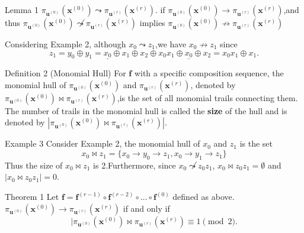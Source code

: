 \documentclass[notheorems,aspectratio=169]{beamer}
\def\bd#1{\boldsymbol{#1}}
\begin{document}
\begin{frame}
    
    \begin{block}{Lemma 1}
        $\pi_{\boldsymbol{u}^{(0)}}(\boldsymbol{x}^{(0)})\leadsto \pi_{\boldsymbol{u}^{(r)}}(\boldsymbol{x}^{(r)})$.
        if $\pi_{\boldsymbol{u}^{(0)}}(\boldsymbol{x}^{(0)})\rightarrow \pi_{\boldsymbol{u}^{(r)}}(\boldsymbol{x}^{(r)})$,and thus
        $\pi_{\boldsymbol{u}^{(0)}}(\boldsymbol{x}^{(0)})\not \leadsto \pi_{\boldsymbol{u}^{(r)}}(\boldsymbol{x}^{(r)})$
        implies $\pi_{\boldsymbol{u}^{(0)}}(\boldsymbol{x}^{(0)})\not \rightarrow \pi_{\boldsymbol{u}^{(r)}}(\boldsymbol{x}^{(r)})$
    \end{block}
    Considering Example 2, although $x_0  \leadsto z_1$,we have $x_0 \not \rightarrow z_1$ since 
    $$
    z_1=y_0 \oplus y_1 =\underline{x_0} \oplus x_1\oplus x_2\oplus x_0x_1 \oplus \underline{x_0} \oplus x_2=x_0x_1\oplus x_1.
    $$
    \begin{block}{Definition 2 (Monomial Hull)}
        For $\bd{f}$ with a  specific composition sequence,
        the monomial hull of $\pi_{\boldsymbol{u}^{(0)}}(\boldsymbol{x}^{(0)})$ and $\pi_{\boldsymbol{u}^{(r)}}(\boldsymbol{x}^{(r)})$,
        denoted by $\pi_{\boldsymbol{u}^{(0)}}(\boldsymbol{x}^{(0)}) \bowtie \pi_{\boldsymbol{u}^{(r)}}(\boldsymbol{x}^{(r)})$,is the set of
        all monomial trails connecting them. The number of trails in the
        monomial hull is called the \textbf{size} of the hull and is denoted by
        $|\pi_{\boldsymbol{u}^{(0)}}(\boldsymbol{x}^{(0)}) \bowtie \pi_{\boldsymbol{u}^{(r)}}(\boldsymbol{x}^{(r)})|$.


    \end{block}
\end{frame}
\begin{frame}
    \begin{block}{Example 3}
        Consider Example 2, the monomial hull of $x_0$ and $z_1$ is the set 
        $$
        x_0 \bowtie z_1=\{x_0 \rightarrow y_0 \rightarrow z_1,x_0 \rightarrow y_1 \rightarrow z_1\}
        $$
        Thus  the size of $x_0 \bowtie z_1$ is 2.Furthermore, since $x_0 \not \leadsto z_0z_1$,
        $x_0 \bowtie z_0z_1 =\emptyset $ and $|x_0 \bowtie z_0z_1|=0$.
    \end{block}
    \begin{block}{Theorem 1}
        Let $\boldsymbol{f}=\boldsymbol{f}^{(r-1)} \circ \boldsymbol{f}^{(r-2)} \circ \dots \circ \boldsymbol{f}^{(0)}$ defined as
        above. $\pi_{\boldsymbol{u}^{(0)}}(\boldsymbol{x}^{(0)}) \rightarrow \pi_{\boldsymbol{u}^{(r)}}(\boldsymbol{x}^{(r)})$
        if and only if 
        $$
        |\pi_{\boldsymbol{u}^{(0)}}(\boldsymbol{x}^{(0)})\bowtie  \pi_{\boldsymbol{u}^{(r)}}(\boldsymbol{x}^{(r)}) \equiv 1 \pmod{2}.
        $$
    \end{block}
\end{frame}
\end{document}
